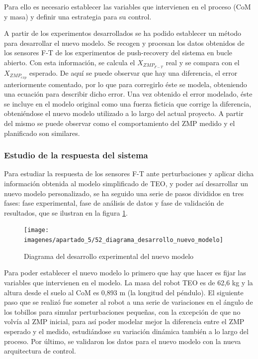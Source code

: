 Para ello es necesario establecer las variables que intervienen en el proceso (CoM y masa) y definir una estrategia para su control. 

A partir de los experimentos desarrollados se ha podido establecer un método para desarrollar el nuevo modelo. Se recogen y procesan los datos obtenidos de los sensores F-T de los experimentos de push-recovery del sistema en bucle abierto. Con esta información, se calcula el $X_{ZMP_{F-T}}$ real y se compara con el $X_{ZMP_{exp}}$ esperado. De aquí se puede observar que hay una diferencia, el error anteriormente comentado, por lo que para corregirlo éste se modela, obteniendo una ecuación para describir dicho error. Una vez obtenido el error modelado, éste se incluye en el modelo original como una fuerza ficticia que corrige la diferencia, obteniéndose el nuevo modelo utilizado a lo largo del actual proyecto. A partir del mismo se puede observar como el comportamiento del ZMP medido y el planificado son similares.


\subsubsection{Estudio de la respuesta del sistema}

Para estudiar la respuesta de los sensores F-T ante perturbaciones y aplicar dicha información obtenida al modelo simplificado de TEO, y poder así desarrollar un nuevo modelo personalizado, se ha seguido una serie de pasos divididos en tres fases: fase experimental, fase de análisis de datos y fase de validación de resultados, que se ilustran en la figura \ref{figura510}. 

\begin{figure}[H]
\centering
\texttt{[image: imagenes/apartado\_5/52\_diagrama\_desarrollo\_nuevo\_modelo]}
\caption{Diagrama del desarrollo experimental del nuevo modelo}
\label{figura510}
\end{figure}

Para poder establecer el nuevo modelo lo primero que hay que hacer es fijar las variables que intervienen en el modelo. La masa del robot TEO es de 62,6 kg y la altura desde el suelo al CoM es 0,893 m (la longitud del péndulo). El siguiente paso que se realizó fue someter al robot a una serie de variaciones en el ángulo de los tobillos para simular perturbaciones pequeñas, con la excepción de que no volvía al ZMP inicial, para así poder modelar mejor la diferencia entre el ZMP esperado y el medido, estudiándose su variación dinámica también a lo largo del proceso. Por último, se validaron los datos para el nuevo modelo con la nueva arquitectura de control.

